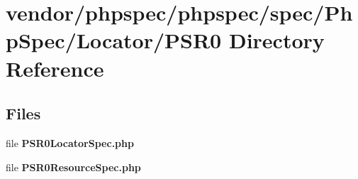 \section{vendor/phpspec/phpspec/spec/\+Php\+Spec/\+Locator/\+P\+S\+R0 Directory Reference}
\label{dir_8a8c9e957ded23cf6dda556f412d8c58}
\subsection*{Files}
\begin{DoxyCompactItemize}
\item 
file {\bf P\+S\+R0\+Locator\+Spec.\+php}
\item 
file {\bf P\+S\+R0\+Resource\+Spec.\+php}
\end{DoxyCompactItemize}
